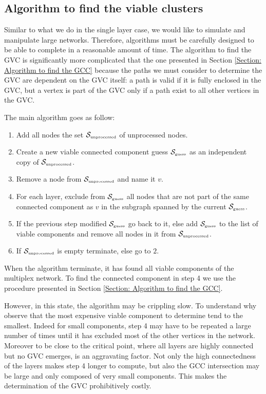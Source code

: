 \documentclass[
11pt, %
english, %
singlespacing, %
nolistspacing, %
liststotoc, %
headsepline, %
]{MastersDoctoralThesis} %
\begin{document}
\subsection{Algorithm to find the viable clusters}

Similar to what we do in the single layer case, we would like to simulate and manipulate large networks. Therefore, algorithms must be carefully designed to be able to complete in a reasonable amount of time. The algorithm to find the GVC is significantly more complicated that the one presented in Section \ref{Section: Algorithm to find the GCC} because the paths we must consider to determine the GVC are dependent on the GVC itself: a path is valid if it is fully enclosed in the GVC, but a vertex is part of the GVC only if a path exist to all other vertices in the GVC. 

The main algorithm goes as follow:

\begin{enumerate}
	\item Add all nodes the set $\mathcal{S}_{\text{\tiny unprocessed}}$ of unprocessed nodes.
	\item Create a new viable connected component guess $\mathcal{S}_{\text{\tiny guess}}$ as an independent copy of $\mathcal{S}_{\text{\tiny unprocessed}}$.
	\item Remove a node from $\mathcal{S}_{\text{\tiny unprocessed}}$ and name it $v$.
	\item For each layer, exclude from $\mathcal{S}_{\text{\tiny guess}}$ all nodes that are not part of the same connected component as $v$ in the subgraph spanned by the current $\mathcal{S}_{\text{\tiny guess}}$.
	\item If the previous step modified $\mathcal{S}_{\text{\tiny guess}}$ go back to it, else add $\mathcal{S}_{\text{\tiny guess}}$ to the list of viable components and remove all nodes in it from $\mathcal{S}_{\text{\tiny unprocessed}}$.
	\item If $\mathcal{S}_{\text{\tiny unprocessed}}$ is empty terminate, else go to $2$.
\end{enumerate}

When the algorithm terminate, it has found all viable components of the multiplex network. To find the connected component in step 4 we use the procedure presented in Section \ref{Section: Algorithm to find the GCC}.

However, in this state, the algorithm may be crippling slow. To understand why observe that the most expensive viable component to determine tend to the smallest. Indeed for small components, step 4 may have to be repeated a large number of times until it has excluded most of the other vertices in the network. Moreover to be close to the critical point, where all layers are highly connected but no GVC emerges, is an aggravating factor. Not only the high connectedness of the layers makes step 4 longer to compute, but also the GCC intersection may be large and only composed of very small components.  This makes the determination of the GVC prohibitively costly.
\end{document}
